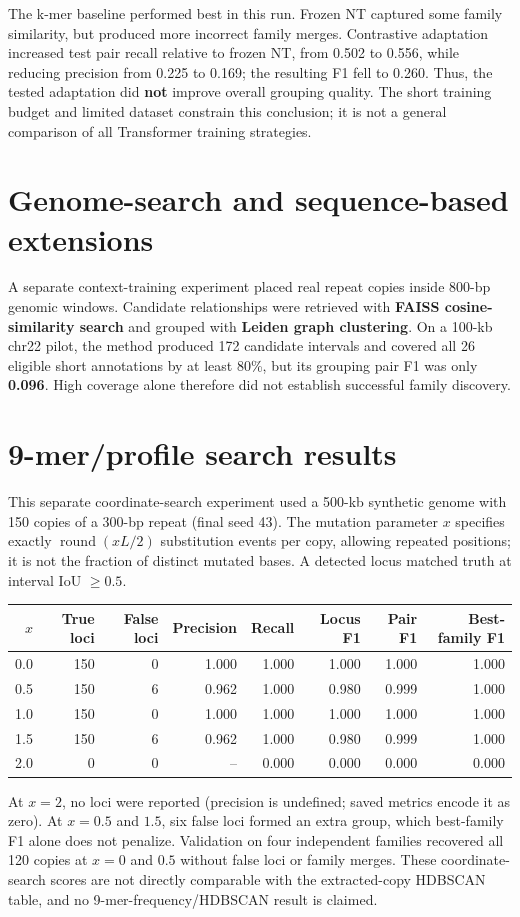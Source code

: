 \documentclass[10pt,a4paper]{article}
\begin{document}
The k-mer baseline performed best in this run. Frozen NT captured some family similarity, but produced more incorrect family merges. Contrastive adaptation increased test pair recall relative to frozen NT, from 0.502 to 0.556, while reducing precision from 0.225 to 0.169; the resulting F1 fell to 0.260. Thus, the tested adaptation did \textbf{not} improve overall grouping quality. The short training budget and limited dataset constrain this conclusion; it is not a general comparison of all Transformer training strategies.

\section*{Genome-search and sequence-based extensions}
A separate context-training experiment placed real repeat copies inside 800-bp genomic windows. Candidate relationships were retrieved with \textbf{FAISS cosine-similarity search} and grouped with \textbf{Leiden graph clustering}. On a 100-kb chr22 pilot, the method produced 172 candidate intervals and covered all 26 eligible short annotations by at least 80\%, but its grouping pair F1 was only \textbf{0.096}. High coverage alone therefore did not establish successful family discovery.

\newpage
\section*{9-mer/profile search results} This separate coordinate-search experiment used a 500-kb synthetic genome with 150 copies of a 300-bp repeat (final seed 43). The mutation parameter $x$ specifies exactly $\operatorname{round}(xL/2)$ substitution events per copy, allowing repeated positions; it is not the fraction of distinct mutated bases. A detected locus matched truth at interval IoU $\geq0.5$.

\begin{center}\small
\begin{tabular}{@{}rrrrrrrr@{}}
\toprule
$x$ & True loci & False loci & Precision & Recall & Locus F1 & Pair F1 & Best-family F1\\
\midrule
0.0 & 150 & 0 & 1.000 & 1.000 & 1.000 & 1.000 & 1.000\\
0.5 & 150 & 6 & 0.962 & 1.000 & 0.980 & 0.999 & 1.000\\
1.0 & 150 & 0 & 1.000 & 1.000 & 1.000 & 1.000 & 1.000\\
1.5 & 150 & 6 & 0.962 & 1.000 & 0.980 & 0.999 & 1.000\\
2.0 & 0 & 0 & -- & 0.000 & 0.000 & 0.000 & 0.000\\
\bottomrule
\end{tabular}
\end{center}
At $x=2$, no loci were reported (precision is undefined; saved metrics encode it as zero). At $x=0.5$ and $1.5$, six false loci formed an extra group, which best-family F1 alone does not penalize. Validation on four independent families recovered all 120 copies at $x=0$ and $0.5$ without false loci or family merges. These coordinate-search scores are not directly comparable with the extracted-copy HDBSCAN table, and no 9-mer-frequency/HDBSCAN result is claimed.
\end{document}

